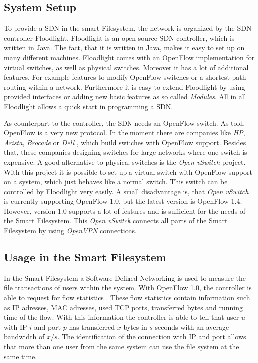 \subsection{System Setup}
To provide a SDN in the smart Filesystem, the network is organized by the SDN controller Floodlight\cite{flood}. Floodlight is an open source SDN controller, which is written in Java. The fact, that it is written in Java, makes it easy to set up on many different machines. Floodlight comes with an OpenFlow implementation for virtual switches, as well as physical switches. Moreover it has a lot of additional features. For example features to modify OpenFlow switches or a shortest path routing within a network. Furthermore it is easy to extend Floodlight by using provided interfaces or adding new basic features as so called \textit{Modules}. All in all Floodlight allows a quick start in programming a SDN.

As counterpart to the controller, the SDN needs an OpenFlow switch. As told, OpenFlow is a very new protocol. In the moment there are companies like \textit{HP}, \textit{Arista}, \textit{Brocade} or \textit{Dell} , which build switches with OpenFlow support. Besides that, these companies designing switches for large networks where one switch is expensive. A good alternative to physical switches is the \textit{Open vSwitch} project\cite{ovs2}. With this project it is possible to set up a virtual switch with OpenFlow support on a system, which just behaves like a normal switch. This switch can be controlled by Floodlight very easily. A small disadvantage is, that \textit{Open vSwitch} is currently supporting OpenFlow 1.0\cite{ovs}, but the latest version is OpenFlow 1.4\cite{ofspec4}. However, version 1.0 supports a lot of features and is sufficient for the needs of the Smart Filesystem.
This \textit{Open vSwitch} connects all parts of the Smart Filesystem by using \textit{OpenVPN} connections.     
   
\subsection{Usage in the Smart Filesystem}\label{usage}
In the Smart Filesystem a Software Defined Networking is used to measure the file transactions of users within the system. With OpenFlow 1.0, the controller is able to request for flow statistics \cite[P.\,31]{ofspec}. These flow statistics contain information such as IP adresses, MAC adresses, used TCP ports, transferred bytes and running time of the flow. With this information the controller is able to tell that user $u$ with IP $i$ and port $p$ has transferred $x$ bytes in $s$ seconds with an average bandwidth of $x/s$. The identification of the connection with IP and port allows that more than one user from the same system can use the file system at the same time.

